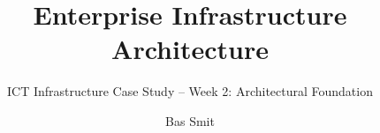 \documentclass{tudelft-report}
\begin{document}
\frontmatter

\title{Enterprise Infrastructure Architecture}
\subtitle{ICT Infrastructure Case Study -- Week 2: Architectural Foundation}
\author{Bas Smit}

\subject{Case Study}

\makecover

\tableofcontents

\mainmatter





\end{document}
